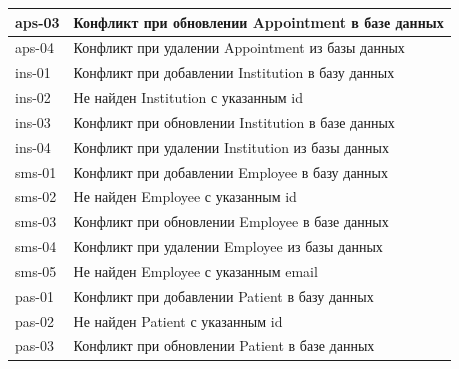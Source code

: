 \documentclass[a4paper,article]{article}
\begin{document}
\begin{sloppypar}
\begin{appendices}
\begin{xltabular}{\textwidth} { |
                >{\hsize} X |
                >{\hsize} X | }
            \hline
            aps-03
            & Конфликт при обновлении Appointment в базе данных \\
            
            \hline
            aps-04
            & Конфликт при удалении Appointment из базы данных \\
            
            \hline
            ins-01
            & Конфликт при добавлении Institution в базу данных \\
            
            \hline
            ins-02
            & Не найден Institution с указанным id \\
            
            \hline
            ins-03
            & Конфликт при обновлении Institution в базе данных \\
            
            \hline
            ins-04
            & Конфликт при удалении Institution из базы данных \\
            
            \hline
            sms-01
            & Конфликт при добавлении Employee в базу данных \\
            
            \hline
            sms-02
            & Не найден Employee с указанным id \\
            
            \hline
            sms-03
            & Конфликт при обновлении Employee в базе данных \\
            
            \hline
            sms-04
            & Конфликт при удалении Employee из базы данных \\
            
            \hline
            sms-05
            & Не найден Employee с указанным email \\
            
            \hline
            pas-01
            & Конфликт при добавлении Patient в базу данных \\
            
            \hline
            pas-02
            & Не найден Patient с указанным id \\
            
            \hline
            pas-03
            & Конфликт при обновлении Patient в базе данных \\
            

\end{xltabular}
\end{appendices}
\end{sloppypar}
\end{document}
